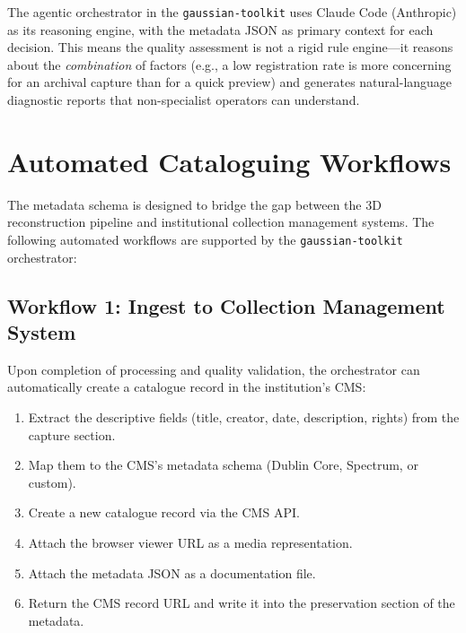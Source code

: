 \begin{technote}
The agentic orchestrator in the \texttt{gaussian-toolkit} uses Claude Code (Anthropic) as its reasoning engine, with the metadata JSON as primary context for each decision. This means the quality assessment is not a rigid rule engine---it reasons about the \emph{combination} of factors (e.g., a low registration rate is more concerning for an archival capture than for a quick preview) and generates natural-language diagnostic reports that non-specialist operators can understand.
\end{technote}

\section{Automated Cataloguing Workflows}
\label{sec:meta-cataloguing}

The metadata schema is designed to bridge the gap between the 3D reconstruction pipeline and institutional collection management systems. The following automated workflows are supported by the \texttt{gaussian-toolkit} orchestrator:

\subsection{Workflow 1: Ingest to Collection Management System}

Upon completion of processing and quality validation, the orchestrator can automatically create a catalogue record in the institution's CMS:

\begin{enumerate}
  \item Extract the descriptive fields (title, creator, date, description, rights) from the capture section.
  \item Map them to the CMS's metadata schema (Dublin Core, Spectrum, or custom).
  \item Create a new catalogue record via the CMS API.
  \item Attach the browser viewer URL as a media representation.
  \item Attach the metadata JSON as a documentation file.
  \item Return the CMS record URL and write it into the preservation section of the metadata.
\end{enumerate}

